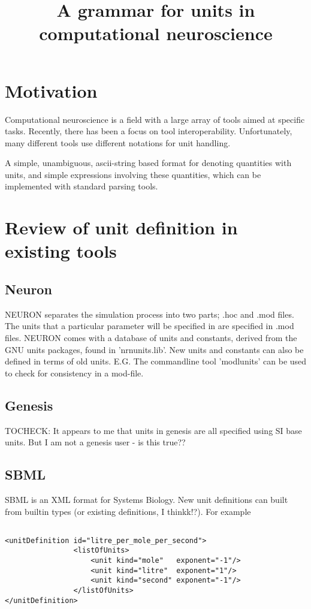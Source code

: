 \documentclass{article}
\title{A grammar for units in computational neuroscience}
\begin{document}
\maketitle

\section*{Motivation}

Computational neuroscience is a field with a large 
array of tools aimed at specific tasks. Recently, 
there has been a focus on tool interoperability. 
Unfortunately, many different tools use different 
notations for unit handling.

A simple, unambiguous, ascii-string based format for denoting quantities with units, and 
simple expressions involving these quantities, which can be implemented with standard parsing tools. 


\section*{Review  of unit definition in existing tools}

\subsection*{Neuron}
NEURON separates the simulation process into two parts; .hoc and .mod files. The units that a particular parameter will be specified in are specified in .mod files. NEURON comes with a database of units and constants, derived from the GNU units packages, found in 'nrnunits.lib'. New units and constants can also be defined in terms of old units. E.G. The commandline tool 'modlunits' can be used to check for consistency in a mod-file.

\subsection*{Genesis}
TOCHECK: It appears to me that units in genesis are all specified using SI base units. But  I am not a genesis user - is this true??


\subsection*{SBML}
SBML is an XML format for Systems Biology. New unit definitions can built from builtin types (or existing definitions, I thinkk!?).
For example

\begin{lstlisting}

<unitDefinition id="litre_per_mole_per_second">
                <listOfUnits>
                    <unit kind="mole"   exponent="-1"/>
                    <unit kind="litre"  exponent="1"/>
                    <unit kind="second" exponent="-1"/>
                </listOfUnits>
</unitDefinition>
\end{lstlisting}
\end{document}
